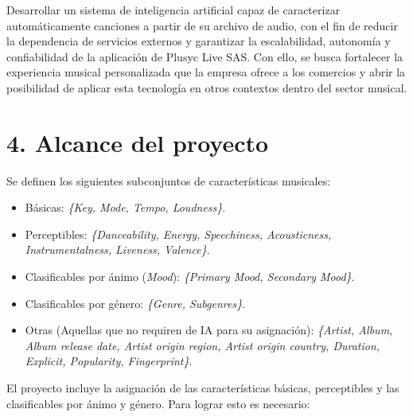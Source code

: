 \documentclass[
11pt, %
]{charter}
\begin{document}

Desarrollar un sistema de inteligencia artificial capaz de caracterizar automáticamente canciones a partir de su archivo de audio, con el fin de reducir la dependencia de servicios externos y garantizar la escalabilidad, autonomía y confiabilidad de la aplicación de Plusyc Live SAS. Con ello, se busca fortalecer la experiencia musical personalizada que la empresa ofrece a los comercios y abrir la posibilidad de aplicar esta tecnología en otros contextos dentro del sector musical.

\section{4. Alcance del proyecto}
\label{sec:alcance}




Se definen los siguientes subconjuntos de características musicales:
\begin{itemize}
  \item Básicas: \textit{\{Key, Mode, Tempo, Loudness\}}.
  \item Perceptibles: \textit{\{Danceability, Energy, Speechiness, Acousticness, Instrumentalness, Liveness, Valence\}}.
  \item Clasificables por ánimo (\textit{Mood}): \textit{\{Primary Mood, Secondary Mood\}}.
  \item Clasificables por género: \textit{\{Genre, Subgenres\}}.
  \item Otras (Aquellas que no requiren de IA para su asignación): \textit{\{Artist, Album, Album release date, Artist origin region, Artist origin country, Duration, Explicit, Popularity, Fingerprint\}}.
\end{itemize}

El proyecto incluye la asignación de las características básicas, perceptibles y las clasificables por ánimo y género. Para lograr esto es necesario:
\end{document}

